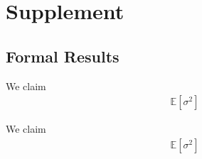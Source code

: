 \documentclass[11pt]{article}
\theoremstyle{definition}
\newenvironment{proof-of-proposition}[1][{}]{\noindent{\bf
    Proof of Proposition {#1}}
  \hspace*{.5em}}{\qed\bigskip\\}
\begin{document}
\section{Supplement}


\subsection{Formal Results}

\begin{proof-of-proposition}[\ref{ARIMA_param_consistency}]
  We claim
  \begin{align}
  \mathbb{E}[ \sigma^{2} ]
  \end{align}
  
  \end{proof-of-proposition}

  \begin{proof-of-proposition}[\ref{ARIMA_conv_distribution}]
    We claim
    \begin{align}
    \mathbb{E}[ \sigma^{2} ]
    \end{align}
    
    \end{proof-of-proposition}
  
\clearpage


 
\end{document}
